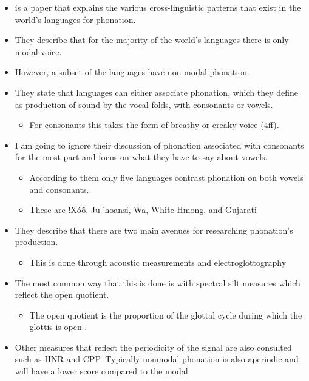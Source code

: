 \begin{itemize}
    \item \citet{espositoCrosslinguisticPatternsPhonation2020} is a paper that explains the various cross-linguistic patterns that exist in the world's languages for phonation. 
    \item They describe that for the majority of the world's languages there is only modal voice. 
    \item However, a subset of the languages have non-modal phonation. 
    \item They state that languages can either associate phonation, which they define as production of sound by the vocal folds, with consonants or vowels. 
    \begin{itemize}
        \item For consonants this takes the form of breathy or creaky voice (4ff).
    \end{itemize}
    \item I am going to ignore their discussion of phonation associated with consonants for the most part and focus on what they have to say about vowels. 
    \begin{itemize}
        \item According to them only five languages contrast phonation on both vowels and consonants. 
        \item These are !Xóõ, Ju|'hoansi, Wa, White Hmong, and Gujarati
    \end{itemize}
    \item They describe that there are two main avenues for researching phonation's production. 
    \begin{itemize}
        \item This is done through acoustic measurements and electroglottography
    \end{itemize}
    \item The most common way that this is done is with spectral silt measures which reflect the open quotient.
    \begin{itemize}
        \item The open quotient is the proportion of the glottal cycle during which the glottis is open \citep{holmbergComparisonsAerodynamicElectroglottographic1995}. 
    \end{itemize} 
    \item Other measures that reflect the periodicity of the signal are also consulted such as HNR and CPP. Typically nonmodal phonation is also aperiodic and will have a lower score compared to the modal. 

\end{itemize}
